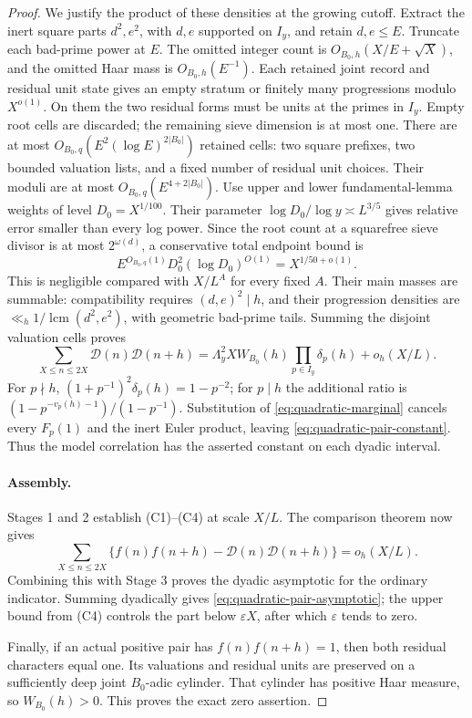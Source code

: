 \begin{proof}
We justify the product of these densities at the growing cutoff.
Extract the inert square parts \(d^2,e^2\), with \(d,e\)
supported on \(I_y\), and retain \(d,e\le E\). Truncate
each bad-prime power at \(E\). The omitted integer count is
\(O_{B_0,h}(X/E+\sqrt X)\), and the omitted Haar mass is
\(O_{B_0,h}(E^{-1})\). Each retained joint record and residual
unit state gives an empty stratum or finitely many progressions
modulo \(X^{o(1)}\). On them the two residual forms must be
units at the primes in \(I_y\). Empty root cells are discarded;
the remaining sieve dimension is at most one. There are at most
\(O_{B_0,q}(E^2(\log E)^{2|B_0|})\) retained cells: two
square prefixes, two bounded valuation lists, and a fixed number
of residual unit choices. Their moduli are at most
\(O_{B_0,q}(E^{4+2|B_0|})\). Use upper and lower
fundamental-lemma weights of level \(D_0=X^{1/100}\).
Their parameter \(\log D_0/\log y\asymp L^{3/5}\)
gives relative error smaller than every log power. Since the
root count at a squarefree sieve divisor is at most
\(2^{\omega(d)}\), a conservative total endpoint bound is
\[
 E^{O_{B_0,q}(1)}D_0^2(\log D_0)^{O(1)}
                         =X^{1/50+o(1)}.
\]
This is negligible compared with \(X/L^A\) for every fixed
\(A\). Their main masses are summable: compatibility requires
\((d,e)^2\mid h\), and their progression densities are
\(\ll_h1/\operatorname{lcm}(d^2,e^2)\), with geometric
bad-prime tails. Summing the disjoint valuation cells proves
\[
 \sum_{X\le n\le2X}\mathcal D(n)\mathcal D(n+h)
   =\Lambda_y^2XW_{B_0}(h)\prod_{p\in I_y}\delta_p(h)
                                                 +o_h(X/L).
\]
For \(p\nmid h\),
\((1+p^{-1})^2\delta_p(h)=1-p^{-2}\); for \(p\mid h\)
the additional ratio is
\((1-p^{-v_p(h)-1})/(1-p^{-1})\). Substitution of
\eqref{eq:quadratic-marginal} cancels every \(F_p(1)\)
and the inert Euler product, leaving
\eqref{eq:quadratic-pair-constant}. Thus the model correlation
has the asserted constant on each dyadic interval.

\paragraph{Assembly.}
Stages 1 and 2 establish \textup{(C1)--(C4)} at scale \(X/L\).
The comparison theorem now gives
\begin{equation}\label{eq:quadratic-model-comparison}
 \sum_{X\le n\le2X}\{f(n)f(n+h)-\mathcal D(n)\mathcal D(n+h)\}
                                      =o_h(X/L).
\end{equation}
Combining this with Stage 3 proves the dyadic asymptotic for the
ordinary indicator. Summing dyadically gives
\eqref{eq:quadratic-pair-asymptotic}; the upper bound from (C4)
controls the part below \(\varepsilon X\), after which
\(\varepsilon\) tends to zero.

Finally, if an actual positive pair has \(f(n)f(n+h)=1\),
then both residual characters equal one. Its valuations and
residual units are preserved on a sufficiently deep joint
\(B_0\)-adic cylinder. That cylinder has positive Haar measure,
so \(W_{B_0}(h)>0\). This proves the exact zero assertion.
\end{proof}

